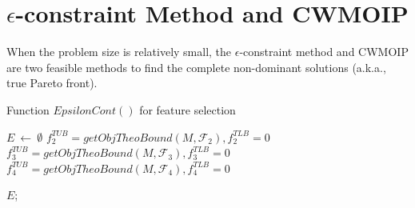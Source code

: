 \section{$\epsilon$-constraint Method and CWMOIP}\label{sec:naiveSolutions}

When the problem size is relatively small, the $\epsilon$-constraint method and CWMOIP are two feasible methods to find the complete non-dominant solutions (a.k.a., true Pareto front).

\begin{algorithm}[t]
\caption{Function \small{$EpsilonCont()$} for feature selection}\label{alg:naiveLP}
\small
    $E~\leftarrow~\emptyset$\;\label{algo:lp:i1}
    $f^{TUB}_2 = getObjTheoBound(M,\mathcal{F}_2), f^{TLB}_2 = 0$\;\label{algo:lp:i2}
    $f^{TUB}_3 = getObjTheoBound(M,\mathcal{F}_3), f^{TLB}_3 = 0 $\;\label{algo:lp:i3}
    $f^{TUB}_4 = getObjTheoBound(M,\mathcal{F}_4), f^{TLB}_4 = 0 $\;\label{algo:lp:i4}


    \KwRet $E$;\label{algo:lp:rt}

\end{algorithm}

